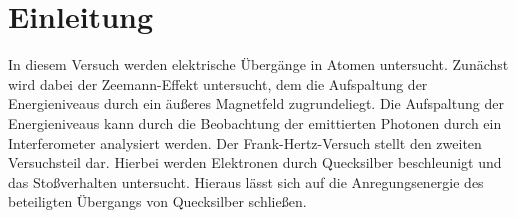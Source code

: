 \section{Einleitung}
In diesem Versuch werden elektrische Übergänge in Atomen untersucht. Zunächst wird dabei der Zeemann-Effekt untersucht, dem die Aufspaltung der Energieniveaus durch ein äußeres Magnetfeld zugrundeliegt. Die Aufspaltung der Energieniveaus kann durch die Beobachtung der emittierten Photonen durch ein Interferometer analysiert werden. Der Frank-Hertz-Versuch stellt den zweiten Versuchsteil dar. Hierbei werden Elektronen durch Quecksilber beschleunigt und das Stoßverhalten untersucht. Hieraus lässt sich auf die Anregungsenergie des beteiligten Übergangs von Quecksilber schließen.
